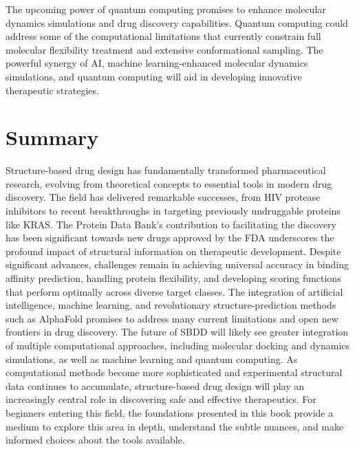 \documentclass[12pt]{article}
\begin{document}
The upcoming power of quantum computing promises to enhance molecular dynamics simulations and drug discovery capabilities. Quantum computing could address some of the computational limitations that currently constrain full molecular flexibility treatment and extensive conformational sampling. The powerful synergy of AI, machine learning-enhanced molecular dynamics simulations, and quantum computing will aid in developing innovative therapeutic strategies.





\section{Summary}

Structure-based drug design has fundamentally transformed pharmaceutical research, evolving from theoretical concepts to essential tools in modern drug discovery. The field has delivered remarkable successes, from HIV protease inhibitors to recent breakthroughs in targeting previously undruggable proteins like KRAS. The Protein Data Bank’s contribution to facilitating the discovery has been significant towards new drugs approved by the FDA underscores the profound impact of structural information on therapeutic development. Despite significant advances, challenges remain in achieving universal accuracy in binding affinity prediction, handling protein flexibility, and developing scoring functions that perform optimally across diverse target classes. The integration of artificial intelligence, machine learning, and revolutionary structure-prediction methods such as AlphaFold promises to address many current limitations and open new frontiers in drug discovery. The future of SBDD will likely see greater integration of multiple computational approaches, including molecular docking and dynamics simulations, as well as machine learning and quantum computing. As computational methods become more sophisticated and experimental structural data continues to accumulate, structure-based drug design will play an increasingly central role in discovering safe and effective therapeutics. For beginners entering this field, the foundations presented in this book provide a medium to explore this area in depth, understand the subtle nuances, and make informed choices about the tools available. 



\end{document}
